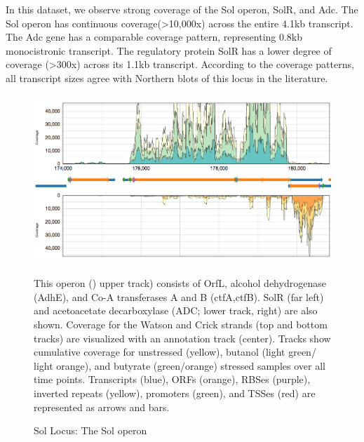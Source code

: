 In this dataset, we observe strong coverage of the Sol operon, SolR, and Adc. The Sol operon has continuous coverage(\textgreater 10,000x) across the entire 4.1kb transcript. The Adc gene has a comparable coverage pattern, representing 0.8kb monocistronic transcript. The regulatory protein SolR has a lower degree of coverage (\textgreater 300x) across its 1.1kb transcript. According to the coverage patterns, all transcript sizes agree with Northern blots of this locus in the literature. 
\begin{figure}
\small
{\includegraphics[width=\textwidth,height=2.5in]{images/Assembly/Sol/Sol-locus.png}
\label{fig:1a}}
\caption{Sol Locus: The Sol operon} This operon () upper track) consists of OrfL, alcohol dehydrogenase (AdhE), and Co-A transferases A and B (ctfA,ctfB). SolR (far left) and acetoacetate decarboxylase (ADC;  lower track, right) are also shown. Coverage for the Watson and Crick strands (top and bottom tracks) are visualized with an annotation track (center). Tracks show cumulative coverage for unstressed (yellow), butanol (light green/ light orange), and butyrate (green/orange) stressed samples over all time points. Transcripts (blue), ORFs (orange), RBSes (purple), inverted repeats (yellow), promoters (green), and TSSes (red) are represented as arrows and bars.
\end{figure}

